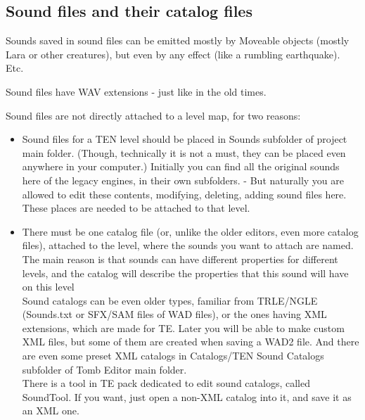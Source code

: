 \subsection{Sound files and their catalog files}
Sounds saved in sound files can be emitted mostly by Moveable objects (mostly Lara or other creatures), but even by any effect (like a rumbling earthquake). Etc.
\par Sound files have WAV extensions - just like in the old times.
\par Sound files are not directly attached to a level map, for two reasons:
\begin{itemize}
    \item Sound files for a TEN level should be placed in Sounds subfolder of project main folder. (Though, technically it is not a must, they can be placed even anywhere in your computer.) Initially you can find all the original sounds here of the legacy engines, in their own subfolders. - But naturally you are allowed to edit these contents, modifying, deleting, adding sound files here. \\ These places are needed to be attached to that level.
    \item There must be one catalog file (or, unlike the older editors, even more catalog files), attached to the level, where the sounds you want to attach are named. The main reason is that sounds can have different properties for different levels, and the catalog will describe the properties that this sound will have on this level \\ Sound catalogs can be even older types, familiar from TRLE/NGLE (Sounds.txt or SFX/SAM files of WAD files), or the ones having XML extensions, which are made for TE. Later you will be able to make custom XML files, but some of them are created when saving a WAD2 file. And there are even some preset XML catalogs in Catalogs/TEN Sound Catalogs subfolder of Tomb Editor main folder. \\ There is a tool in TE pack dedicated to edit sound catalogs, called SoundTool. If you want, just open a non-XML catalog into it, and save it as an XML one.
\end{itemize}
